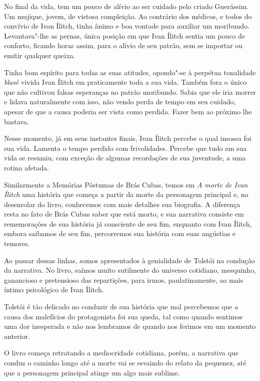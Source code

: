 \documentclass[12pt]{extarticle}
\begin{document}
No final da vida, tem um pouco de alívio ao ser cuidado pelo criado
Guerássim. Um mujique, jovem, de vistosa compleição. Ao contrário dos
médicos, e todos do convívio de Ivan Ílitch, tinha ânimo e boa vontade
para auxiliar um moribundo. Levantava"-lhe as pernas, única posição em
que Ivan Ílitch sentia um pouco de conforto, ficando horas assim,
para o alívio de seu patrão, sem se importar ou emitir qualquer queixa.




Tinha bom espírito para todas as suas atitudes, opondo"-se à perpétua
tonalidade \emph{blasé} vivida Ivan Ílitch em praticamente toda a sua
vida. Também fora o único que não cultivou falsas esperanças no patrão
moribundo. Sabia que ele iria morrer e lidava naturalmente com isso, não
vendo perda de tempo em seu cuidado, apesar de que a causa poderia ser
vista como perdida. Fazer bem ao próximo lhe bastava.

Nesse momento, já em seus instantes finais, Ivan Ílitch percebe o qual
insossa foi sua vida. Lamenta o tempo perdido com
frivolidades. Percebe que tudo em
sua vida se resumiu, com exceção de algumas recordações de sua juventude,
a uma rotina afetada.

Similarmente a Memórias Póstumas de Brás Cubas, temos em 
\emph{A morte de Ivan Ílitch} uma história que começa 
a partir da morte da personagem principal
e, no desenrolar do livro, conhecemos com mais detalhes sua biografia. A
diferença resta no fato de Brás Cubas saber que está morto, e sua narrativa
consiste em rememorações de sua história já consciente de seu fim,
enquanto com Ivan Ílitch, embora saibamos de seu fim, percorremos sua
história com suas angústias e temores.

Ao passar dessas linhas, somos apresentados à genialidade 
de Tolstói na condução da narrativa. No livro, saímos muito
sutilmente do universo cotidiano, mesquinho, ganancioso e pretensioso
das repartições, para irmos, paulatinamente, ao
mais íntimo psicológico de Ivan Ílitch.

Tolstói é tão delicado no conduzir de sua história que mal percebemos
que a causa dos malefícios do protagonista foi sua queda, tal como
quando sentimos uma dor inesperada e não nos lembramos de quando nos
ferimos em um momento anterior.

O livro começa retratando a mediocridade cotidiana, porém, a narrativa
que conduz o caminho longo até a morte vai se esvaindo do relato da
pequenez, até que a personagem principal atinge um algo mais sublime.
\end{document}
